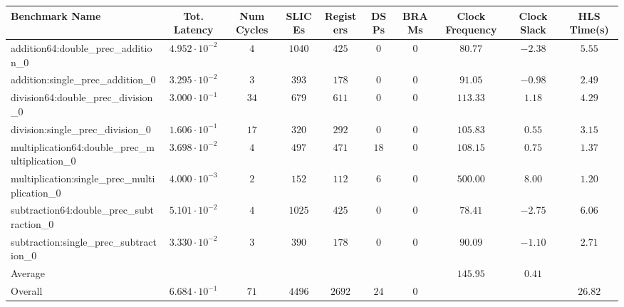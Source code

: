 \begin{tabular}{|l|c|c|c|c|c|c|c|c|c|}
\hline
Benchmark Name                                   & Tot. Latency            & Num Cycles & SLICEs   & Registers & DSPs   & BRAMs & Clock Frequency & Clock Slack & HLS Time(s) \\
\hline
addition64:double\_prec\_addition\_0             & $ 4.952 \cdot 10^{-2} $ & $ 4      $ & $ 1040 $ & $ 425   $ & $ 0  $ & $ 0 $ & $ 80.77       $ & $ -2.38   $ & $ 5.55    $ \\
addition:single\_prec\_addition\_0               & $ 3.295 \cdot 10^{-2} $ & $ 3      $ & $ 393  $ & $ 178   $ & $ 0  $ & $ 0 $ & $ 91.05       $ & $ -0.98   $ & $ 2.49    $ \\
division64:double\_prec\_division\_0             & $ 3.000 \cdot 10^{-1} $ & $ 34     $ & $ 679  $ & $ 611   $ & $ 0  $ & $ 0 $ & $ 113.33      $ & $ 1.18    $ & $ 4.29    $ \\
division:single\_prec\_division\_0               & $ 1.606 \cdot 10^{-1} $ & $ 17     $ & $ 320  $ & $ 292   $ & $ 0  $ & $ 0 $ & $ 105.83      $ & $ 0.55    $ & $ 3.15    $ \\
multiplication64:double\_prec\_multiplication\_0 & $ 3.698 \cdot 10^{-2} $ & $ 4      $ & $ 497  $ & $ 471   $ & $ 18 $ & $ 0 $ & $ 108.15      $ & $ 0.75    $ & $ 1.37    $ \\
multiplication:single\_prec\_multiplication\_0   & $ 4.000 \cdot 10^{-3} $ & $ 2      $ & $ 152  $ & $ 112   $ & $ 6  $ & $ 0 $ & $ 500.00      $ & $ 8.00    $ & $ 1.20    $ \\
subtraction64:double\_prec\_subtraction\_0       & $ 5.101 \cdot 10^{-2} $ & $ 4      $ & $ 1025 $ & $ 425   $ & $ 0  $ & $ 0 $ & $ 78.41       $ & $ -2.75   $ & $ 6.06    $ \\
subtraction:single\_prec\_subtraction\_0         & $ 3.330 \cdot 10^{-2} $ & $ 3      $ & $ 390  $ & $ 178   $ & $ 0  $ & $ 0 $ & $ 90.09       $ & $ -1.10   $ & $ 2.71    $ \\
\hline
Average                                          & $                     $ & $        $ & $      $ & $       $ & $    $ & $   $ & $ 145.95      $ & $ 0.41    $ & $         $ \\
\hline
Overall                                          & $ 6.684 \cdot 10^{-1} $ & $ 71     $ & $ 4496 $ & $ 2692  $ & $ 24 $ & $ 0 $ & $             $ & $         $ & $ 26.82   $ \\
\hline
\end{tabular}
